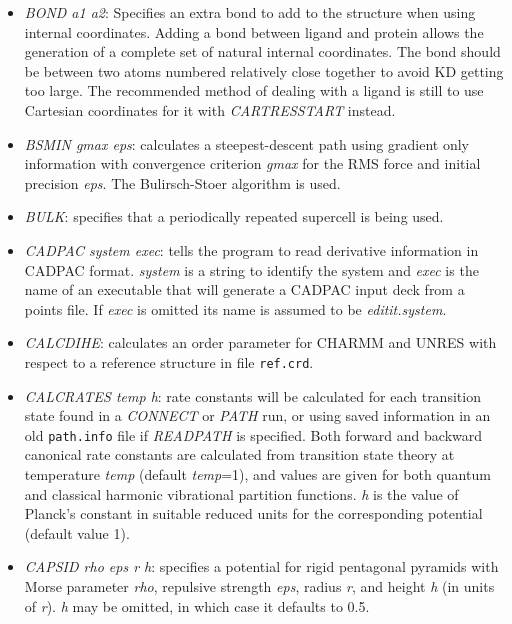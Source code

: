 \documentclass[12pt,a4paper,dvips]{article}
\begin{document}
\begin{itemize}
\item {\it BOND a1 a2\/}: Specifies an extra bond to add to the structure when
  using internal coordinates. Adding a bond between ligand and protein allows the generation of a complete set
  of natural
  internal coordinates. The bond should be between two atoms numbered
  relatively close together to avoid KD getting too large. The recommended
  method of dealing with a ligand is still to use Cartesian coordinates for it
  with {\it CARTRESSTART} instead.
 
\item {\it BSMIN gmax eps\/}: calculates a steepest-descent path using gradient only
      information with convergence criterion {\it gmax\/} for the RMS force and initial
      precision {\it eps\/}. The Bulirsch-Stoer algorithm is used.

\item {\it BULK\/}: specifies that a periodically repeated supercell is being used.

\item {\it CADPAC system exec\/}: tells the program to read derivative information in
CADPAC format. {\it system\/} is a string to identify the system and {\it exec\/} is
the name of an executable that will generate a CADPAC input deck from a points file.
If {\it exec\/} is omitted its name is assumed to be {\it editit.system}.

\item {\it CALCDIHE\/}: calculates an order parameter for CHARMM and UNRES with respect to
a reference structure in file {\tt ref.crd}.

\item {\it CALCRATES temp h\/}: rate constants will be calculated for each transition state
found in a {\it CONNECT\/} or {\it PATH\/} run, or using saved information in an
old {\tt path.info} file if {\it READPATH\/} is specified. Both forward and backward canonical
rate constants are calculated from transition state theory at temperature {\it temp\/} (default
{\it temp\/}=1), and values are given
for both quantum and classical harmonic vibrational partition functions. {\it h\/} is the
value of Planck's constant in suitable reduced units for the corresponding potential (default value 1).


\item {\it CAPSID rho eps r h}: specifies a potential for rigid pentagonal pyramids with
Morse parameter {\it rho}, repulsive strength {\it eps}, radius {\it r}, and height {\it h} (in
units of {\it r}).
{\it h} may be omitted, in which case it defaults to 0.5.


\end{itemize}
\end{document}
